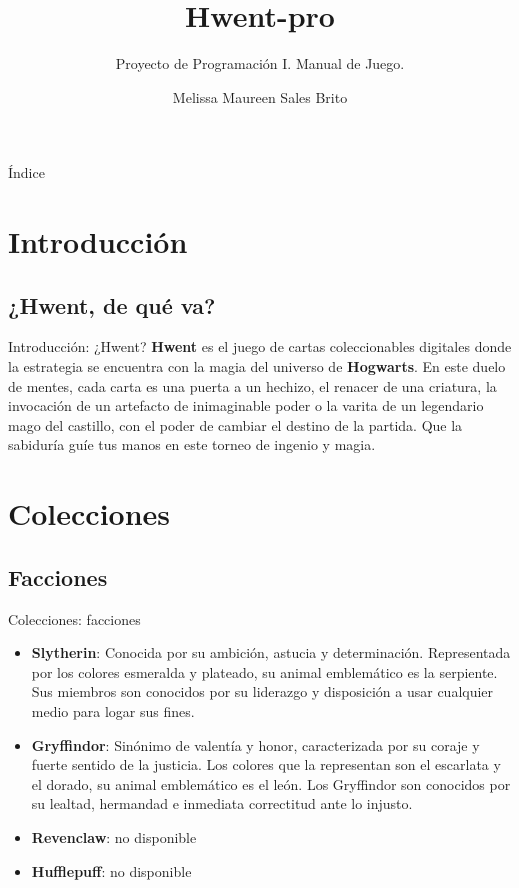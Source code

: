 \documentclass[a4paper, 12pt]{beamer}
\title{\textcolor{dorado}{Hwent}\textcolor{plata}{-pro}}
\subtitle{Proyecto de Programación I. Manual de Juego.}
\author{Melissa Maureen Sales Brito}
\institute{MatCom}
\date{}
\begin{document}
\maketitle

\begin{frame}{\textcolor{plata}{Índice}}
\vspace{8pt}
\setcounter{tocdepth}{2}
\tableofcontents
\end{frame}

\section{Introducción}

\subsection{¿Hwent, de qué va?}
\begin{frame}{\textcolor{plata}{Introducción: ¿Hwent?}}
\textbf{Hwent} es el juego de cartas coleccionables digitales donde la estrategia se encuentra con la magia del universo de \textcolor{dorado}{\textbf{Hogwarts}}. En este duelo de mentes, cada carta es una puerta a un hechizo, el renacer de una criatura, la invocación de un artefacto de inimaginable poder o la varita de un legendario mago del castillo, con el poder de cambiar el destino de la partida. Que la sabiduría guíe tus manos en este torneo de ingenio y magia.
\end{frame}

\section{Colecciones}

\subsection{Facciones}
\begin{frame}{\textcolor{plata}{Colecciones: facciones}}
\begin{itemize}
 \item \small \small\textbf{\textcolor{verde}{Slytherin}}: Conocida por su ambición, astucia y determinación. Representada por los colores esmeralda y plateado, su animal emblemático es la serpiente. Sus miembros son conocidos por su liderazgo y disposición a usar cualquier medio para logar sus fines.
 \item \small \small \textbf{\textcolor{rojo}{Gryffindor}}: Sinónimo de valentía y honor, caracterizada por su coraje y fuerte sentido de la justicia. Los colores que la representan son el escarlata y el dorado, su animal emblemático es el león. Los Gryffindor son conocidos por su lealtad, hermandad e inmediata correctitud ante lo injusto.
 \item \small \small \textbf{\textcolor{azul}{Revenclaw}}: no disponible
 \item \small \small \textbf{\textcolor{amarillo}{Hufflepuff}}: no disponible
\end{itemize}
\end{frame}
\end{document}
